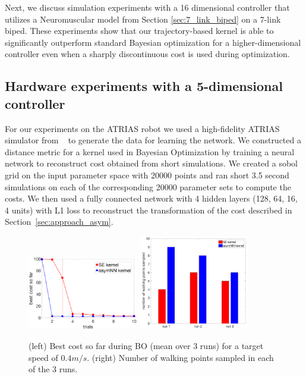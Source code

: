 Next, we discuss simulation experiments with a 16 dimensional controller that utilizes a Neuromuscular model from Section \ref{sec:7_link_biped} on a 7-link biped. These experiments show that our trajectory-based kernel is able to significantly outperform standard Bayesian optimization for a higher-dimensional controller even when a sharply discontinuous cost is used during optimization.

\subsection{Hardware experiments with a 5-dimensional controller}
\label{experiments_atrias}

For our experiments on the ATRIAS robot we used a high-fidelity ATRIAS simulator from ~\cite{martin2015robust} to generate the data for learning the network. 
We constructed a distance metric for a kernel used in Bayesian Optimization by training a neural network to reconstruct cost obtained from short simulations. We created a sobol grid on the input parameter space with 20000 points and ran short 3.5 second simulations on each of the corresponding 20000 parameter sets to compute the costs. We then used a fully connected network with 4 hidden layers (128, 64, 16, 4 units) with L1 loss to reconstruct the transformation of the cost described in Section~\ref{sec:approach_asym}.

\begin{figure}[t]
\centering
\includegraphics[width=0.43\textwidth]{img/hdw_runs.png}
\hspace{0.15cm}
\includegraphics[width=0.43\textwidth]{img/walking_pts_sampled}
\caption{\small{(left) Best cost so far during BO (mean over 3 runs) for a target speed of $0.4m/s$. (right) Number of walking points sampled in each of the 3 runs.}}
\label{fig:bo_runs_plot_atrias_hw}
\end{figure}

